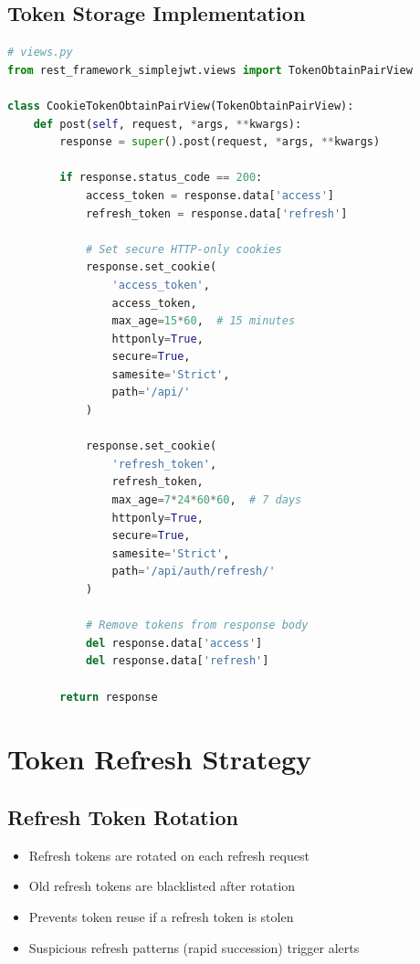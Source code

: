 \documentclass{report}
\begin{document}
\subsection{Token Storage Implementation}
\begin{lstlisting}[language=Python]
# views.py
from rest_framework_simplejwt.views import TokenObtainPairView

class CookieTokenObtainPairView(TokenObtainPairView):
    def post(self, request, *args, **kwargs):
        response = super().post(request, *args, **kwargs)
        
        if response.status_code == 200:
            access_token = response.data['access']
            refresh_token = response.data['refresh']
            
            # Set secure HTTP-only cookies
            response.set_cookie(
                'access_token',
                access_token,
                max_age=15*60,  # 15 minutes
                httponly=True,
                secure=True,
                samesite='Strict',
                path='/api/'
            )
            
            response.set_cookie(
                'refresh_token',
                refresh_token,
                max_age=7*24*60*60,  # 7 days
                httponly=True,
                secure=True,
                samesite='Strict',
                path='/api/auth/refresh/'
            )
            
            # Remove tokens from response body
            del response.data['access']
            del response.data['refresh']
        
        return response
\end{lstlisting}

\section{Token Refresh Strategy}

\subsection{Refresh Token Rotation}
\begin{itemize}
\item Refresh tokens are rotated on each refresh request
\item Old refresh tokens are blacklisted after rotation
\item Prevents token reuse if a refresh token is stolen
\item Suspicious refresh patterns (rapid succession) trigger alerts
\end{itemize}
\end{document}
